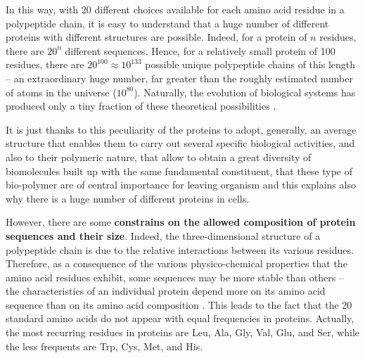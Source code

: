In this way, with 20 different choices available for each amino acid residue in a polypeptide chain, it is easy to understand that a huge number of different proteins with different structures are possible. Indeed, for a protein of $n$ residues, there are $20^n$ different sequences. Hence, for a relatively small protein of 100 residues, there are $20^{100} \approx 10^{133}$ possible unique polypeptide chains of this length -- an extraordinary huge number, far greater than the roughly estimated number of atoms in the universe ($10^{80}$). Naturally, the evolution of biological systems has produced only a tiny fraction of these theoretical possibilities \cite{creighton2010biophysical}. 

It is just thanks to this peculiarity of the proteins to adopt, generally, an average structure that enables them to carry out several specific biological activities, and also to their polymeric nature, that allow to obtain a great diversity of biomolecules built up with the same fundamental constituent, that these type of bio-polymer are of central importance for leaving organism and this explains also why there is a huge number of different proteins in cells.  

However, there are some \textbf{constrains on the allowed composition of protein sequences and their size}. 
Indeed, the three-dimensional structure of a polypeptide chain is due to the relative interactions between its various residues. Therefore, as a consequence of the various physico-chemical properties that the amino acid residues exhibit, some sequences may be more stable than others -- the characteristics of an individual protein depend more on its amino acid sequence than on its amino acid composition
\cite{voet2016fundamentals}. 
This leads to the fact that the 20 standard amino acids do not appear with equal frequencies in proteins. Actually, the most recurring residues in proteins are Leu, Ala, Gly, Val, Glu, and Ser, while the less frequents are Trp, Cys, Met, and His. 

